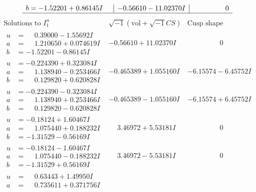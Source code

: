 \documentclass[1p]{elsarticle_modified}
\theoremstyle{definition}
\newcommand{\I}{\sqrt{-1}}
\begin{document}
$$\begin{array}{c|c|c}
\begin{aligned}
b &= -1.52201 + 0.86145 I\end{aligned}
 & -0.56610 - 11.02370 I & \phantom{-0.000000 } 0\\
 \hline 
 \end{array}$$\newpage$$\begin{array}{c|c|c}  
\text{Solutions to }I^u_{1}& \I (\text{vol} + \sqrt{-1}CS) & \text{Cusp shape}\\
 \hline 
\begin{aligned}
u &= \phantom{-}0.39000 - 1.55692 I \\
a &= \phantom{-}1.210650 + 0.074619 I \\
b &= -1.52201 - 0.86145 I\end{aligned}
 & -0.56610 + 11.02370 I & \phantom{-0.000000 } 0 \\ \hline\begin{aligned}
u &= -0.224390 + 0.323084 I \\
a &= \phantom{-}1.138940 - 0.253466 I \\
b &= \phantom{-}0.129820 + 0.620828 I\end{aligned}
 & -0.465389 + 1.055160 I & -6.15574 - 6.45752 I \\ \hline\begin{aligned}
u &= -0.224390 - 0.323084 I \\
a &= \phantom{-}1.138940 + 0.253466 I \\
b &= \phantom{-}0.129820 - 0.620828 I\end{aligned}
 & -0.465389 - 1.055160 I & -6.15574 + 6.45752 I \\ \hline\begin{aligned}
u &= -0.18124 + 1.60467 I \\
a &= \phantom{-}1.075440 + 0.188232 I \\
b &= -1.31529 - 0.56169 I\end{aligned}
 & \phantom{-}3.46972 + 5.53181 I & \phantom{-0.000000 } 0 \\ \hline\begin{aligned}
u &= -0.18124 - 1.60467 I \\
a &= \phantom{-}1.075440 - 0.188232 I \\
b &= -1.31529 + 0.56169 I\end{aligned}
 & \phantom{-}3.46972 - 5.53181 I & \phantom{-0.000000 } 0 \\ \hline\begin{aligned}
u &= \phantom{-}0.63443 + 1.49950 I \\
a &= \phantom{-}0.735611 + 0.371756 I \\

\end{aligned}
\end{array}$$
\end{document}
